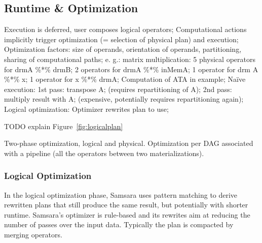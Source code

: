 \documentclass{article}
\begin{document}
\subsection{Runtime \& Optimization}

Execution is deferred, user composes logical operators; Computational actions implicitly trigger optimization (= selection of physical plan) and execution; Optimization factors:  size of operands, orientation of operands, partitioning, sharing of computational paths; e. g.: matrix multiplication: 5 physical operators for drmA \%*\% drmB; 2 operators for drmA \%*\% inMemA; 1 operator for drm A \%*\% x; 1 operator for x \%*\% drmA; Computation of ATA in example; Naïve execution: 1st  pass: transpose A; (requires repartitioning of A); 2nd pass: multiply result with A; (expensive, potentially requires repartitioning again); Logical optimization: Optimizer rewrites plan to use; 

TODO explain Figure~\ref{fig:logicalplan}

Two-phase optimization, logical and physical. Optimization per DAG associated with a pipeline (all the operators between two materializations).

\subsubsection{Logical Optimization}

In the logical optimization phase, Samsara uses pattern matching to derive rewritten plans that still produce the same result, but potentially with shorter runtime. Samsara's optimizer is rule-based and its rewrites aim at reducing the number of passes over the input data. Typically the plan is compacted by merging operators. 
\end{document}
